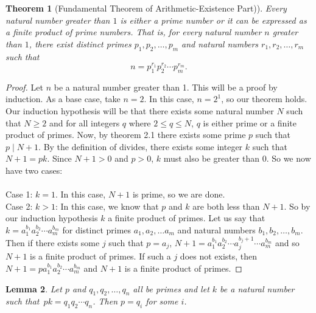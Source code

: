 \documentclass[12pt,leqno]{article}
\numberwithin{equation}{section}
\newtheorem{thm}{Theorem}[section]
\newtheorem{lem}[thm]{Lemma}
\theoremstyle{definition}
\begin{document}
\setcounter{thm}{6}


\begin{thm}[Fundamental Theorem of Arithmetic-Existence Part)]
Every natural number greater than $1$ is either a prime number or it
can be expressed as a finite product of prime numbers. That is, for
every natural number $n$ greater than $1$, there exist distinct
primes $p_1, p_2, \hdots, p_m$ and natural numbers $r_1, r_2,
\hdots, r_m$ such that \[n = p_1^{r_1}p_2^{r_2}\cdots p_m^{r_m}.\]
\end{thm}

\begin{proof}[Proof]
Let $n$ be a natural number greater than 1.  This will be a proof by induction.  As a base case, take $n = 2$.  In this case, $n = 2^1$, so our theorem holds.  Our induction hypothesis will be that there exists some natural number $N$ such that $N \geq 2$ and for all integers $q$ where $2 \leq q \leq N$, $q$ is either prime or a finite product of primes.  Now, by theorem 2.1 there exists some prime $p$ such that $p \mid N+1$.  By the definition of divides, there exists some integer $k$ such that $N+1 = pk$.  Since $N+1 > 0$ and $p > 0$, $k$ must also be greater than 0.  So we now have two cases:\\
\\
Case 1: $k = 1$.  In this case, $N+1$ is prime, so we are done.\\
\newpage
Case 2: $k > 1$:  In this case, we know that $p$ and $k$ are both less than $N+1$.  So by our induction hypothesis $k$ a finite product of primes.  Let us say that $k = a_1^{b_1}a_2^{b_2}\cdots a_m^{b_m}$ for distinct primes $a_1, a_2, \hdots a_m$ and natural numbers $b_1, b_2, \hdots, b_m$.  Then if there exists some $j$ such that $p = a_j$, $N+1 = a_1^{b_1}a_2^{b_2}\cdots a_j^{b_j+1}\cdots a_m^{b_m}$ and so $N+1$ is a finite product of primes.  If such a $j$ does not exists, then $N+1 = pa_1^{b_1}a_2^{b_2}\cdots a_m^{b_m}$ and $N+1$ is a finite product of primes.
\end{proof}



\begin{lem}
Let $p$ and $q_1, q_2, \hdots, q_n$ all be primes and let $k$ be a
natural number such that~$p k = q_1q_2 \cdots q_n$.  Then $p = q_i$
for some $i$.
\end{lem}
\end{document}
